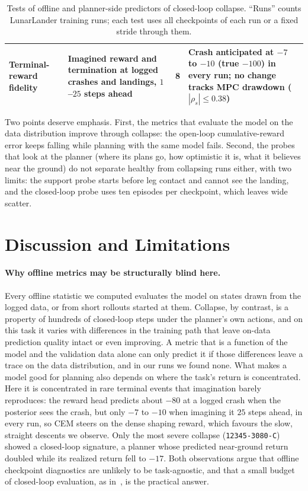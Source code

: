 \documentclass[11pt]{article}
\theoremstyle{remark}
\begin{document}
\begin{table}[htbp]
\begin{tabular}{@{}p{3.5cm} p{5.1cm} p{1.7cm} p{5.3cm}@{}}
Terminal-reward fidelity & Imagined reward and termination at logged crashes and landings, $1$--$25$ steps ahead & 8 & Crash anticipated at $-7$ to $-10$ (true $-100$) in every run; no change tracks MPC drawdown ($|\rho_s| \le 0.38$) \\
\bottomrule
\end{tabular}
\caption{Tests of offline and planner-side predictors of closed-loop collapse. ``Runs'' counts LunarLander training runs; each test uses all checkpoints of each run or a fixed stride through them.}
\label{tab:negative}
\end{table}

Two points deserve emphasis. First, the metrics that evaluate the model on the data distribution improve through collapse: the open-loop cumulative-reward error keeps falling while planning with the same model fails. Second, the probes that look at the planner (where its plans go, how optimistic it is, what it believes near the ground) do not separate healthy from collapsing runs either, with two limits: the support probe starts before leg contact and cannot see the landing, and the closed-loop probe uses ten episodes per checkpoint, which leaves wide scatter. 

\section{Discussion and Limitations}
\label{sec:discussion}

\paragraph{Why offline metrics may be structurally blind here.} Every offline statistic we computed evaluates the model on states drawn from the logged data, or from short rollouts started at them. Collapse, by contrast, is a property of hundreds of closed-loop steps under the planner's own actions, and on this task it varies with differences in the training path that leave on-data prediction quality intact or even improving. A metric that is a function of the model and the validation data alone can only predict it if those differences leave a trace on the data distribution, and in our runs we found none. What makes a model good for planning also depends on where the task's return is concentrated. Here it is concentrated in rare terminal events that imagination barely reproduces: the reward head predicts about $-80$ at a logged crash when the posterior sees the crash, but only $-7$ to $-10$ when imagining it $25$ steps ahead, in every run, so CEM steers on the dense shaping reward, which favours the slow, straight descents we observe. Only the most severe collapse (\texttt{12345-3080-C}) showed a closed-loop signature, a planner whose predicted near-ground return doubled while its realized return fell to $-17$. Both observations argue that offline checkpoint diagnostics are unlikely to be task-agnostic, and that a small budget of closed-loop evaluation, as in~\cite{yang2026boms}, is the practical answer.
\end{document}

